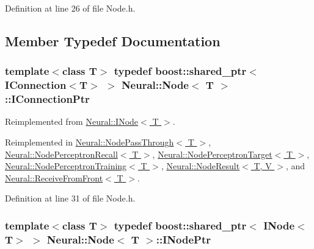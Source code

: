 Definition at line 26 of file Node.h.



\subsection{Member Typedef Documentation}
\hypertarget{class_neural_1_1_node_ac797b836161befa12cd9897926139c14}{
\subsubsection[{IConnectionPtr}]{\setlength{\rightskip}{0pt plus 5cm}template$<$class T$>$ typedef boost::shared\_\-ptr$<$ {\bf IConnection}$<$T$>$ $>$ {\bf Neural::Node}$<$ T $>$::{\bf IConnectionPtr}}}
\label{class_neural_1_1_node_ac797b836161befa12cd9897926139c14}


Reimplemented from \hyperlink{class_neural_1_1_i_node_a5243be0a422bcddc5a71a79920d09fd1}{Neural::INode$<$ T $>$}.



Reimplemented in \hyperlink{class_neural_1_1_node_pass_through_abad3481def64e79eb5d4c7e1a9155106}{Neural::NodePassThrough$<$ T $>$}, \hyperlink{class_neural_1_1_node_perceptron_recall_a3810ccef790454bbb05dcb86a1743d30}{Neural::NodePerceptronRecall$<$ T $>$}, \hyperlink{class_neural_1_1_node_perceptron_target_abdb5cb819de661fc83edb4eceb81f7e8}{Neural::NodePerceptronTarget$<$ T $>$}, \hyperlink{class_neural_1_1_node_perceptron_training_acf502a8079c8e875773ac940986af738}{Neural::NodePerceptronTraining$<$ T $>$}, \hyperlink{class_neural_1_1_node_result_adff4d0f9fa1cfcafd13113a00b7a3ff7}{Neural::NodeResult$<$ T, V $>$}, and \hyperlink{class_neural_1_1_receive_from_front_abf496040ce9745e7e1fc8274f9492295}{Neural::ReceiveFromFront$<$ T $>$}.



Definition at line 31 of file Node.h.

\hypertarget{class_neural_1_1_node_ae2242f73792c89cebc4403da7b2b1a7e}{
\subsubsection[{INodePtr}]{\setlength{\rightskip}{0pt plus 5cm}template$<$class T$>$ typedef boost::shared\_\-ptr$<$ {\bf INode}$<$T$>$ $>$ {\bf Neural::Node}$<$ T $>$::{\bf INodePtr}}}
\label{class_neural_1_1_node_ae2242f73792c89cebc4403da7b2b1a7e}


